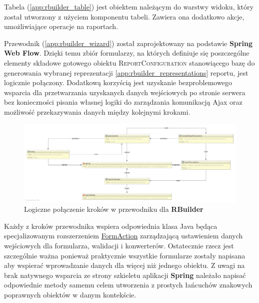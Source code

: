 			Tabela (\ref{app:rbuilder_table}) jest obiektem należącym do warstwy widoku, który został utworzony z użyciem komponentu
			tabeli. Zawiera ona dodatkowo akcje, umożliwiające operacje na raportach. 
			
			Przewodnik (\ref{app:rbuilder_wizard}) został zaprojektowany na podstawie \textbf{Spring Web Flow}. Dzięki 
			temu zbiór formularzy, na których definiuje się poszczególne elementy składowe gotowego obiektu \textsc{ReportConfiguration}
			stanowiącego bazę do generowania wybranej reprezentacji \ref{app:rbuilder_representations} reportu, jest logicznie
			połączony. Dodatkową korzyścią jest uzyskanie bezproblemowego wsparcia dla przetwarzania uzyskanych danych wejściowych 
			po stronie serwera bez konieczności pisania własnej logiki do zarządzania komunikacją Ajax oraz możliwość przekazywania
			danych między kolejnymi krokami. 
			\begin{figure}[H]
				\centering
				\includegraphics[width=1.0\textwidth]{images/rbuilder_flow}
				\caption[Logiczne połączenie kroków w przewodniku dla \textbf{RBuilder}]{
					Logiczne połączenie kroków w przewodniku dla \textbf{RBuilder}
				}
				\label{app:rbuilder_diagram_of_flow}
			\end{figure}
			Każdy z kroków przewodnika wspiera odpowiednia klasa Java będąca specjalizowanym rozszerzeniem \href{http://docs.spring.io/spring-webflow/docs/2.4.0.M1/api/org/springframework/webflow/action/FormAction.html}{FormAction} zarządzającą ustawieniem danych wejściowych
			dla formularza, walidacji i konwerterów. Ostatecznie rzecz jest szczególnie ważna ponieważ praktycznie wszystkie formularze
			zostały napisana aby wspierać wprowadzanie danych dla więcej niż jednego obiektu. Z uwagi na brak natywnego wsparcia ze strony
			szkieletu aplikacji \textbf{Spring} należało napisać odpowiednie metody samemu celem utworzenia z prostych łańcuchów
			znakowych poprawnych obiektów w danym kontekście. 
				 
